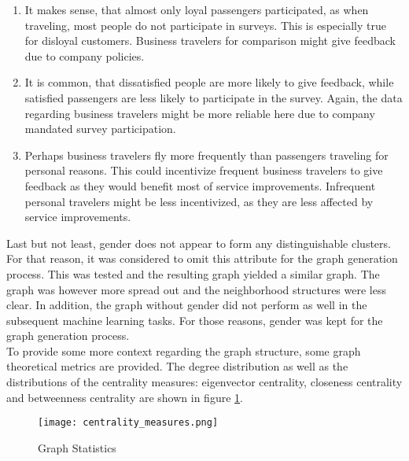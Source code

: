   \begin{enumerate}
    \item It makes sense, that almost only loyal passengers participated, as
      when traveling, most people do not participate in surveys. This is
      especially true for disloyal customers. Business travelers for comparison
      might give feedback due to company policies.
    \item It is common, that dissatisfied people are more likely to give
      feedback, while satisfied passengers are less likely to participate in
      the survey. Again, the data regarding business travelers might be more
      reliable here due to company mandated survey participation.
    \item Perhaps business travelers fly more frequently than passengers
      traveling for personal reasons. This could incentivize frequent business
      travelers to give feedback as they would benefit most of service
      improvements. Infrequent personal travelers might be less incentivized,
      as they are less affected by service improvements. 
  \end{enumerate}

  \noindent Last but not least, gender does not appear to form any distinguishable 
  clusters. For that reason, it was considered to omit this attribute for the 
  graph generation process. This was tested and the resulting graph yielded 
  a similar graph. The graph was however more spread out and the neighborhood 
  structures were less clear. In addition, the graph without gender did not 
  perform as well in the subsequent machine learning tasks. For those reasons, 
  gender was kept for the graph generation process. \\

  \noindent To provide some more context regarding the graph structure, some
  graph theoretical metrics are provided. The degree distribution as well as 
  the distributions of the centrality measures: eigenvector centrality, 
  closeness centrality and betweenness centrality are shown in 
  figure \ref{fig:centrality_measures}.

  \begin{figure}[h]
	  \centering
	  \texttt{[image: centrality\_measures.png]}
	  \caption{Graph Statistics}
      \label{fig:centrality_measures}
  \end{figure}


